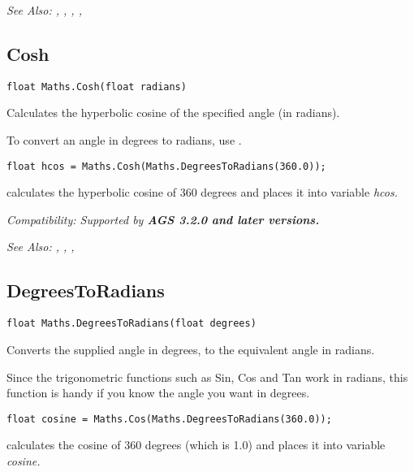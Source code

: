\it{See Also:} ,
, ,
, 


\subsection{Cosh}\label{Maths.Cosh}%

\begin{verbatim}
float Maths.Cosh(float radians)
\end{verbatim}
Calculates the hyperbolic cosine of the specified angle (in radians).

To convert an angle in degrees to radians, use .

\begin{verbatim}
float hcos = Maths.Cosh(Maths.DegreesToRadians(360.0));
\end{verbatim}
calculates the hyperbolic cosine of 360 degrees and places it into variable \it{hcos}.

\it{Compatibility:} Supported by \bf{AGS 3.2.0} and later versions.

\it{See Also:} ,
,
, 


\subsection{DegreesToRadians}\label{Maths.DegreesToRadians}%

\begin{verbatim}
float Maths.DegreesToRadians(float degrees)
\end{verbatim}
Converts the supplied angle in degrees, to the equivalent angle in radians.

Since the trigonometric functions such as Sin, Cos and Tan work in radians, this
function is handy if you know the angle you want in degrees.

\begin{verbatim}
float cosine = Maths.Cos(Maths.DegreesToRadians(360.0));
\end{verbatim}
calculates the cosine of 360 degrees (which is 1.0) and places it into variable \it{cosine}.

